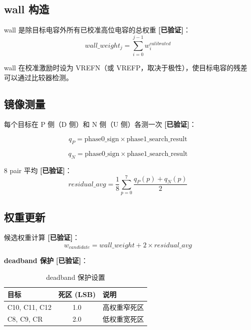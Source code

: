 \documentclass[UTF8,a4paper,11pt]{ctexart}
\newcommand{\verified}{\textcolor{verifiedgreen}{\textbf{[已验证]}}}
\begin{document}
\subsection{wall 构造}

wall 是除目标电容外所有已校准高位电容的总权重 \verified：
\begin{equation}
wall\_weight_j = \sum_{i=0}^{j-1} w_i^{calibrated}
\label{eq:wall-weight}
\end{equation}

wall 在校准激励时设为 VREFN（或 VREFP，取决于极性），使目标电容的残差可以通过比较器检测。

\subsection{镜像测量}

每个目标在 P 侧（D 侧）和 N 侧（U 侧）各测一次 \verified：

\begin{equation}
q_P = \text{phase0\_sign} \times \text{phase1\_search\_result}
\label{eq:qp}
\end{equation}

\begin{equation}
q_N = \text{phase0\_sign} \times \text{phase1\_search\_result}
\label{eq:qn}
\end{equation}

8 pair 平均 \verified：
\begin{equation}
residual\_avg = \frac{1}{8} \sum_{p=0}^{7} \frac{q_P(p) + q_N(p)}{2}
\label{eq:residual-avg-8}
\end{equation}

\subsection{权重更新}

候选权重计算 \verified：
\begin{equation}
w_{candidate} = wall\_weight + 2 \times residual\_avg
\label{eq:wcandidate}
\end{equation}

\textbf{deadband 保护} \verified：

\begin{table}[H]
\centering
\caption{deadband 保护设置}
\label{tab:deadband}
\begin{tabular}{lcl}
\toprule
目标 & 死区 (LSB) & 说明 \\
\midrule
C10, C11, C12 & 1.0 & 高权重窄死区 \\
C8, C9, CR    & 2.0 & 低权重宽死区 \\
\bottomrule
\end{tabular}
\end{table}
\end{document}
